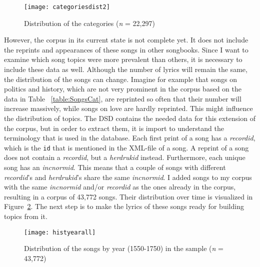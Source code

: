 \begin{figure}[hbt!]
	\centering
	\texttt{[image: categoriesdist2]}
	\caption{Distribution of the categories (\textit{n} = 22,297)}
	\label{fig:CatDist}
\end{figure}

However, the corpus in its current state is not complete yet. It does not include the reprints and appearances of these songs in other songbooks. Since I want to examine which song topics were more prevalent than others, it is necessary to include these data as well. Although the number of lyrics will remain the same, the distribution of the songs can change. Imagine for example that songs on politics and history, which are not very prominent in the corpus based on the data in Table ~\ref{table:SongsCat}, are reprinted so often that their number will increase massively, while songs on love are hardly reprinted. This might influence the distribution of topics. The DSD contains the needed data for this extension of the corpus, but in order to extract them, it is import to understand the terminology that is used in the database. Each first print of a song has a \textit{recordid}, which is the \texttt{id} that is mentioned in the XML-file of a song. A reprint of a song does not contain a \textit{recordid}, but a \textit{herdrukid} instead. Furthermore, each unique song has an \textit{incnormid}. This means that a couple of songs with different \textit{recordid}'s and \textit{herdrukid}'s share the same \textit{incnormid}. I added songs to my corpus with the same \textit{incnormid} and/or \textit{recordid} as the ones already in the corpus, resulting in a corpus of 43,772 songs. Their distribution over time is visualized in Figure~\ref{fig:DistSongsSample}. The next step is to make the lyrics of these songs ready for building topics from it.

\begin{figure}[hbt!]
	\centering
	\texttt{[image: histyearall]}
	\caption{Distribution of the songs by year (1550-1750) in the sample (\textit{n} = 43,772)}
	\label{fig:DistSongsSample}
\end{figure}
